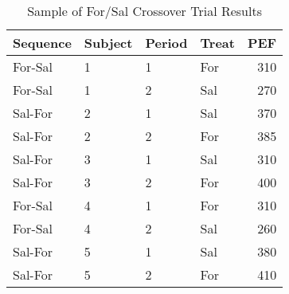 \begin{table}
\centering
\caption{Sample of For/Sal Crossover Trial Results}
\centering
\begin{tabular}[t]{l|l|l|l|r}
\hline
Sequence & Subject & Period & Treat & PEF\\
\hline
For-Sal & 1 & 1 & For & 310\\
\hline
For-Sal & 1 & 2 & Sal & 270\\
\hline
Sal-For & 2 & 1 & Sal & 370\\
\hline
Sal-For & 2 & 2 & For & 385\\
\hline
Sal-For & 3 & 1 & Sal & 310\\
\hline
Sal-For & 3 & 2 & For & 400\\
\hline
For-Sal & 4 & 1 & For & 310\\
\hline
For-Sal & 4 & 2 & Sal & 260\\
\hline
Sal-For & 5 & 1 & Sal & 380\\
\hline
Sal-For & 5 & 2 & For & 410\\
\hline
\end{tabular}
\end{table}
